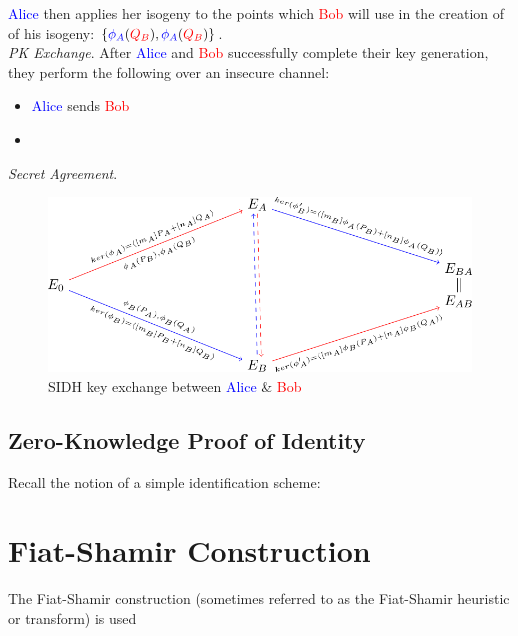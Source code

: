 \textcolor{blue}{Alice} then applies her isogeny to the points which \textcolor{red}{Bob} will use in the creation of of his isogeny: $\{\textcolor{blue}{\phi_A}(\textcolor{red}{Q_B}),\textcolor{blue}{\phi_A}(\textcolor{red}{Q_B})\}$. \\

\noindent
\textit{PK Exchange}. After \textcolor{blue}{Alice} and \textcolor{red}{Bob} successfully complete their key generation, they perform the following over an insecure channel:\\
\begin{itemize}
\item \textcolor{blue}{Alice} sends \textcolor{red}{Bob}
\item
\end{itemize}

\noindent
\textit{Secret Agreement}.\\

\begin{figure}[htb]
\centering
\includegraphics[scale=0.5]{keyexchange.png} %
\caption{SIDH key exchange between \textcolor{blue}{Alice} \& \textcolor{red}{Bob}}
\label{fig:kex} %
\end{figure}

\subsection{Zero-Knowledge Proof of Identity}

Recall the notion of a simple identification scheme:

\section{Fiat-Shamir Construction}

The Fiat-Shamir construction (sometimes referred to as the Fiat-Shamir heuristic or transform) is used

